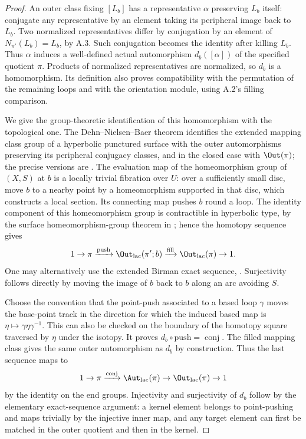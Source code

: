 \begin{proof}
An outer class fixing $[L_b]$ has a representative $\alpha$ preserving $L_b$ itself: conjugate any representative by an element taking its peripheral image back to $L_b$. Two normalized representatives differ by conjugation by an element of $N_{\pi'}(L_b)=L_b$, by A.3. Such conjugation becomes the identity after killing $L_b$. Thus $\alpha$ induces a well-defined actual automorphism $d_b([\alpha])$ of the specified quotient $\pi$. Products of normalized representatives are normalized, so $d_b$ is a homomorphism. Its definition also proves compatibility with the permutation of the remaining loops and with the orientation module, using A.2's filling comparison.

We give the group-theoretic identification of this homomorphism with the topological one. The Dehn--Nielsen--Baer theorem identifies the extended mapping class group of a hyperbolic punctured surface with the outer automorphisms preserving its peripheral conjugacy classes, and in the closed case with $\Out(\pi)$; the precise versions are \cite[Theorems 8.1 and 8.8]{A_FarbMargalit2012}. The evaluation map of the homeomorphism group of $(X,S)$ at $b$ is a locally trivial fibration over $U$: over a sufficiently small disc, move $b$ to a nearby point by a homeomorphism supported in that disc, which constructs a local section. Its connecting map pushes $b$ round a loop. The identity component of this homeomorphism group is contractible in hyperbolic type, by the surface homeomorphism-group theorem in \cite[Lemma 2.1 and Theorem 1.1]{A_Yagasaki2000}; hence the homotopy sequence gives
\[
1\to\pi\xrightarrow{\mathrm{push}}\Out_{\mathrm{lac}}(\pi';b)
\xrightarrow{\mathrm{fill}}\Out_{\mathrm{lac}}(\pi)\to1.
\]
One may alternatively use the extended Birman exact sequence, \cite[Theorem 4.6 and the immediately following extended-group remark]{A_FarbMargalit2012}. Surjectivity follows directly by moving the image of $b$ back to $b$ along an arc avoiding $S$.

Choose the convention that the point-push associated to a based loop $\gamma$ moves the base-point track in the direction for which the induced based map is $\eta\mapsto\gamma\eta\gamma^{-1}$. This can also be checked on the boundary of the homotopy square traversed by $\eta$ under the isotopy. It proves $d_b\circ\mathrm{push}=\operatorname{conj}$. The filled mapping class gives the same outer automorphism as $d_b$ by construction. Thus the last sequence maps to
\[
1\to\pi\xrightarrow{\operatorname{conj}}\Aut_{\mathrm{lac}}(\pi)
\to\Out_{\mathrm{lac}}(\pi)\to1
\]
by the identity on the end groups. Injectivity and surjectivity of $d_b$ follow by the elementary exact-sequence argument: a kernel element belongs to point-pushing and maps trivially by the injective inner map, and any target element can first be matched in the outer quotient and then in the kernel.


\end{proof}
